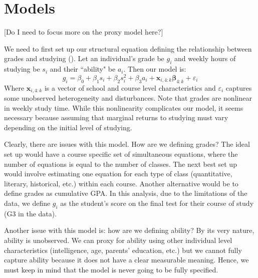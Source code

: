 \documentclass[12pt]{article}
\begin{document}
\newpage
\section{Models}
\textcolor{BrickRed}{[Do I need to focus more on the proxy model here?]}

We need to first set up our structural equation defining the relationship between grades and studying (\cite{CardKrueger}). Let an individual's grade be $g_i$ and weekly hours of studying be $s_i$ and their ``ability" be $a_i$. Then our model is:
$$
g_i = \beta_0 + \beta_1 s_i + \beta_2 s_i^2  + \beta_3 a_i + \bm{x}_{i,4:k}\bm{\beta}_{4:k} + \varepsilon_i
$$
Where $\bm{x}_{i,4:k}$ is a vector of school and course level characteristics and $\varepsilon_i$ captures some unobserved heterogeneity and disturbances. Note that grades are nonlinear in weekly study time. While this nonlinearity complicates our model, it seems necessary because assuming that marginal returns to studying must vary depending on the initial level of studying.

Clearly, there are issues with this model. How are we defining grades? The ideal set up would have a course specific set of simultaneous equations, where the number of equations is equal to the number of classes. The next best set up would involve estimating one equation for each type of class (quantitative, literary, historical, etc.) within each course. Another alternative would be to define grades as cumulative GPA. In this analysis, due to the limitations of the data, we define $g_i$ as the student's score on the final test for their course of study (G3 in the data).

Another issue with this model is: how are we defining ability? By its very nature, ability is unobserved. We can proxy for ability using other individual level characteristics (intelligence, age, parents' education, etc.) but we cannot fully capture ability because it does not have a clear measurable meaning. Hence, we must keep in mind that the model is never going to be fully specified.
\end{document}
